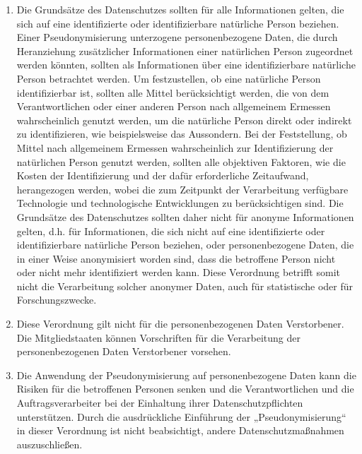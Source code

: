 \begin{enumerate}
   \item Die Grundsätze des Datenschutzes sollten für alle Informationen gelten, die sich auf eine identifizierte oder
    identifizierbare natürliche Person beziehen. Einer Pseudonymisierung unterzogene personenbezogene Daten, die durch
    Heranziehung zusätzlicher Informationen einer natürlichen Person zugeordnet werden könnten, sollten als
    Informationen über eine identifizierbare natürliche Person betrachtet werden. Um festzustellen, ob eine natürliche
    Person identifizierbar ist, sollten alle Mittel berücksichtigt werden, die von dem Verantwortlichen oder einer
    anderen Person nach allgemeinem Ermessen wahrscheinlich genutzt werden, um die natürliche Person direkt oder
    indirekt zu identifizieren, wie beispielsweise das Aussondern. Bei der Feststellung, ob Mittel nach allgemeinem
    Ermessen wahrscheinlich zur Identifizierung der natürlichen Person genutzt werden, sollten alle objektiven
    Faktoren, wie die Kosten der Identifizierung und der dafür erforderliche Zeitaufwand, herangezogen werden, wobei
    die zum Zeitpunkt der Verarbeitung verfügbare Technologie und technologische Entwicklungen zu berücksichtigen sind.
    Die Grundsätze des Datenschutzes sollten daher nicht für anonyme Informationen gelten, d.h. für Informationen, die
    sich nicht auf eine identifizierte oder identifizierbare natürliche Person beziehen, oder personenbezogene Daten,
    die in einer Weise anonymisiert worden sind, dass die betroffene Person nicht oder nicht mehr identifiziert werden
    kann. Diese Verordnung betrifft somit nicht die Verarbeitung solcher anonymer Daten, auch für statistische oder für
    Forschungszwecke.%
   \label{itm:eg-26}
   

   \item Diese Verordnung gilt nicht für die personenbezogenen Daten Verstorbener. Die Mitgliedstaaten können
    Vorschriften für die Verarbeitung der personenbezogenen Daten Verstorbener vorsehen.%
   \label{itm:eg-27}
   

   \item Die Anwendung der Pseudonymisierung auf personenbezogene Daten kann die Risiken für die betroffenen Personen
    senken und die Verantwortlichen und die Auftragsverarbeiter bei der Einhaltung ihrer Datenschutzpflichten
    unterstützen. Durch die ausdrückliche Einführung der „Pseudonymisierung“ in dieser Verordnung ist nicht
    beabsichtigt, andere Datenschutzmaßnahmen auszuschließen.%
   \label{itm:eg-28}
   

\end{enumerate}
